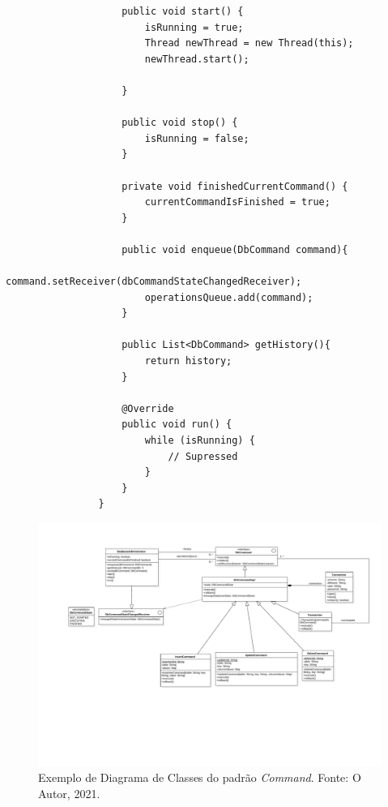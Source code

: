 \documentclass[12pt, a4paper]{article}
\newcommand{\tit}[1]{\textit{#1}}
\begin{document}
\begin{enumerate}[label=\textbf{\arabic*.}]
\begin{lstlisting}
                    public void start() {
                        isRunning = true;
                        Thread newThread = new Thread(this);
                        newThread.start();
                
                    }
                
                    public void stop() {
                        isRunning = false;
                    }
                
                    private void finishedCurrentCommand() {
                        currentCommandIsFinished = true;
                    }
                
                    public void enqueue(DbCommand command){
                        command.setReceiver(dbCommandStateChangedReceiver);
                        operationsQueue.add(command);
                    }
                
                    public List<DbCommand> getHistory(){
                        return history;
                    }
                
                    @Override
                    public void run() {
                        while (isRunning) {
                            // Supressed
                        }
                    }
                }
            \end{lstlisting}
        
        
         \begin{figure}[!ht]
              \centering
              \includegraphics[width=\textwidth, trim = 2cm 6cm 1cm 1cm, clip]{3a.pdf}
                \caption{Exemplo de Diagrama de Classes do padrão \tit{Command}. Fonte: O Autor, 2021.}
              \label{fig:question3a}
          \end{figure}
          

\end{enumerate}
\end{document}

